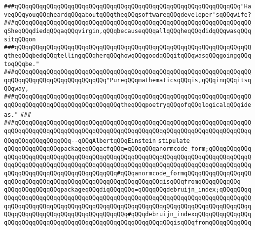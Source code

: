 \newline
\newline
\verb|###qQQqqQQqqQQqqQQqqQQqqQQqqQQqqQQqqQQqqQQqqQQqqQQqqQQqqQQqqQQqqQQq"HaveqQQqyouqQQqheardqQQqaboutqQQqtheqQQqsoftwareqQQqdeveloper'sqQQqwife?|\newline
\verb|###qQQqqQQqqQQqqQQqqQQqqQQqqQQqqQQqqQQqqQQqqQQqqQQqqQQqqQQqqQQqqQQqqQQqSheqQQqdiedqQQqaqQQqvirgin,qQQqbecauseqQQqallqQQqheqQQqdidqQQqwasqQQqsitqQQqon|\newline
\verb|###qQQqqQQqqQQqqQQqqQQqqQQqqQQqqQQqqQQqqQQqqQQqqQQqqQQqqQQqqQQqqQQqqQQqtheqQQqbedqQQqtellingqQQqherqQQqhowqQQqgoodqQQqitqQQqwasqQQqgoingqQQqtoqQQqbe."|\newline
\newline
\newline
\newline
\newline
\verb|###qQQqqQQqqQQqqQQqqQQqqQQqqQQqqQQqqQQqqQQqqQQqqQQqqQQqqQQqqQQqqQQqqQQqqQQqqQQqqQQqqQQqqQQqqQQqqQQq"PureqQQqmathematicsqQQqis,qQQqinqQQqitsqQQqway,|\newline
\verb|###qQQqqQQqqQQqqQQqqQQqqQQqqQQqqQQqqQQqqQQqqQQqqQQqqQQqqQQqqQQqqQQqqQQqqQQqqQQqqQQqqQQqqQQqqQQqqQQqqQQqtheqQQqpoetryqQQqofqQQqlogicalqQQqideas."|\newline
\verb|###|\newline
\verb|###qQQqqQQqqQQqqQQqqQQqqQQqqQQqqQQqqQQqqQQqqQQqqQQqqQQqqQQqqQQqqQQqqQQqqQQqqQQqqQQqqQQqqQQqqQQqqQQqqQQqqQQqqQQqqQQqqQQqqQQqqQQqqQQqqQQqqQQqqQQqqQQqqQQqqQQqqQQq--qQQqAlbertqQQqEinstein|\newline
\newline
\newline
\verb|stipulate|\newline
\verb|qQQqqQQqqQQqqQQqpackageqQQqacfqQQq=qQQqqQQqanormcode_form;qQQqqQQqqQQqqQQqqQQqqQQqqQQqqQQqqQQqqQQqqQQqqQQqqQQqqQQqqQQqqQQqqQQqqQQqqQQqqQQqqQQqqQQqqQQqqQQqqQQqqQQqqQQqqQQqqQQqqQQqqQQqqQQqqQQqqQQqqQQqqQQqqQQqqQQqqQQqqQQqqQQqqQQqqQQqqQQqqQQqqQQq#qQQqanormcode_formqQQqqQQqqQQqqQQqqQQqqQQqqQQqqQQqqQQqqQQqqQQqqQQqqQQqqQQqqQQqqQQqisqQQqfromqQQqqQQqqQQq|\newline
\verb|qQQqqQQqqQQqqQQqpackageqQQqdiqQQqqQQq=qQQqqQQqdebruijn_index;qQQqqQQqqQQqqQQqqQQqqQQqqQQqqQQqqQQqqQQqqQQqqQQqqQQqqQQqqQQqqQQqqQQqqQQqqQQqqQQqqQQqqQQqqQQqqQQqqQQqqQQqqQQqqQQqqQQqqQQqqQQqqQQqqQQqqQQqqQQqqQQqqQQqqQQqqQQqqQQqqQQqqQQqqQQqqQQqqQQqqQQq#qQQqdebruijn_indexqQQqqQQqqQQqqQQqqQQqqQQqqQQqqQQqqQQqqQQqqQQqqQQqqQQqqQQqqQQqqQQqisqQQqfromqQQqqQQqqQQq|\newline
